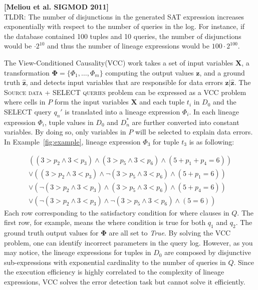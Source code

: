\noindent \textbf{[Meliou et al. SIGMOD 2011]} \\
TLDR: The number of disjunctions in the generated SAT expression increases
exponentially with respect to the number of queries in the log. For instance,
if the database contained 100 tuples and 10 queries, the number of
disjunctions would be $\cdot 2^{10}$ and thus the number of lineage
expressions would be $100\cdot 2^{100}$.

The View-Conditioned Causality(VCC) work takes a set of input variables
$\mathbf{X}$, a transformation $\mathbf{\Phi} =\{\Phi_1, \dots , \Phi_m\}$
computing the output values $\mathbf{z}$, and a ground truth
$\hat{\mathbf{z}}$, and detects input variables that are responsible for data
errors $\mathbf{z}|\hat{\mathbf{z}}$. The \textsc{Source data + SELECT
queries} problem can be expressed as a VCC problem where cells in $P$ form the
input variables $\mathbf{X}$ and each tuple $t_i$ in $D_0$ and the SELECT
query $q_n'$ is translated into a lineage expression $\Phi_i$. In each lineage
expression $\Phi_i$, tuple values in $D_0$ and $D_n^*$ are further converted
into constant variables. By doing so, only variables in $P$ will be selected
to explain data errors. In Example~\ref{fig:example}, lineage expression
$\Phi_3$ for tuple $t_3$ is as following:

{\small
\begin{eqnarray*}
&((3 > p_2 \wedge 3 < p_3) \wedge (3 > p_5 \wedge 3 < p_6) \wedge (5 + p_1+p_4 = 6)) &\\
&\vee ((3 > p_2 \wedge 3 < p_3) \wedge \neg(3 > p_5 \wedge 3 < p_6) \wedge (5 + p_1= 6))& \\
&\vee (\neg(3 > p_2 \wedge 3 < p_3) \wedge (3 > p_5 \wedge 3 < p_6) \wedge (5 + p_4= 6))& \\
&\vee (\neg(3 > p_2 \wedge 3 < p_3) \wedge \neg(3 > p_5 \wedge 3 < p_6) \wedge (5 = 6))&
\end{eqnarray*}
}
Each row corresponding to the satisfactory condition for where clauses in $Q$.
The first row, for example, means the where condition is true for both $q_1$
and $q_2$. The ground truth output values for $\mathbf{\Phi}$ are all set to
\textit{True}. By solving the VCC problem, one can identify incorrect
parameters in the query log. However, as you may notice, the lineage
expressions for tuples in $D_0$ are composed by disjunctive sub-expressions
with exponential cardinality to the number of queries in $Q$. Since the
execution efficiency is highly correlated to the complexity of lineage
expressions, VCC solves the error detection task but cannot solve it
efficiently.

